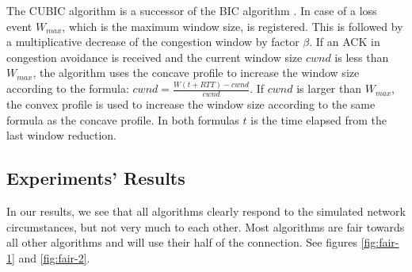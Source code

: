 \documentclass{article}
\begin{document}
The CUBIC algorithm is a successor of the BIC algorithm \cite{cubic-tcp-congestion}. In case of a loss event $W_{max}$, which is the maximum window size, is registered. This is followed by a multiplicative decrease of the congestion window by factor $\beta$. If an ACK in congestion avoidance is received and the current window size $cwnd$ is less than $W_{max}$, the algorithm uses the concave profile to increase the window size according to the formula: $cwnd = \frac{W(t+RTT)-cwnd}{cwnd}$. If $cwnd$ is larger than $W_{max}$, the convex profile is used to increase the window size according to the same formula as the concave profile. In both formulas $t$ is the time elapsed from the last window reduction.


\subsection{Experiments' Results}\label{sub:experiment-results}

In our results, we see that all algorithms clearly respond to the simulated
network circumstances, but not very much to each other. Most algorithms are
fair towards all other algorithms and will use their half of the connection.
See figures \ref{fig:fair-1} and \ref{fig:fair-2}.
\end{document}
